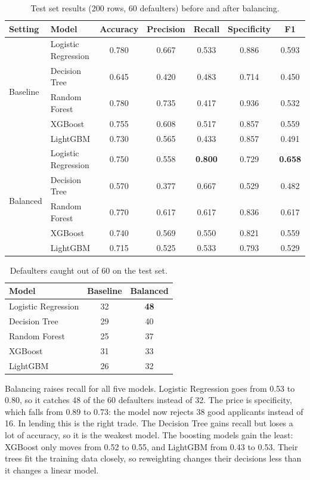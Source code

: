 \documentclass[11pt,a4paper]{article}
\begin{document}
\begin{table}[H]
\centering
\caption{Test set results (200 rows, 60 defaulters) before and after balancing.}
\label{tab:results}
\begin{tabular}{llccccc}
\toprule
Setting & Model & Accuracy & Precision & Recall & Specificity & F1 \\
\midrule
\multirow{5}{*}{Baseline} & Logistic Regression & 0.780 & 0.667 & 0.533 & 0.886 & 0.593 \\
 & Decision Tree & 0.645 & 0.420 & 0.483 & 0.714 & 0.450 \\
 & Random Forest & 0.780 & 0.735 & 0.417 & 0.936 & 0.532 \\
 & XGBoost & 0.755 & 0.608 & 0.517 & 0.857 & 0.559 \\
 & LightGBM & 0.730 & 0.565 & 0.433 & 0.857 & 0.491 \\
\midrule
\multirow{5}{*}{Balanced} & Logistic Regression & 0.750 & 0.558 & \textbf{0.800} & 0.729 & \textbf{0.658} \\
 & Decision Tree & 0.570 & 0.377 & 0.667 & 0.529 & 0.482 \\
 & Random Forest & 0.770 & 0.617 & 0.617 & 0.836 & 0.617 \\
 & XGBoost & 0.740 & 0.569 & 0.550 & 0.821 & 0.559 \\
 & LightGBM & 0.715 & 0.525 & 0.533 & 0.793 & 0.529 \\
\bottomrule
\end{tabular}
\end{table}

\begin{table}[H]
\centering
\caption{Defaulters caught out of 60 on the test set.}
\begin{tabular}{lcc}
\toprule
Model & Baseline & Balanced \\
\midrule
Logistic Regression & 32 & \textbf{48} \\
Decision Tree & 29 & 40 \\
Random Forest & 25 & 37 \\
XGBoost & 31 & 33 \\
LightGBM & 26 & 32 \\
\bottomrule
\end{tabular}
\end{table}

Balancing raises recall for all five models. Logistic Regression goes from 0.53 to 0.80, so it catches 48 of the 60 defaulters instead of 32. The price is specificity, which falls from 0.89 to 0.73: the model now rejects 38 good applicants instead of 16. In lending this is the right trade. The Decision Tree gains recall but loses a lot of accuracy, so it is the weakest model. The boosting models gain the least: XGBoost only moves from 0.52 to 0.55, and LightGBM from 0.43 to 0.53. Their trees fit the training data closely, so reweighting changes their decisions less than it changes a linear model.
\end{document}
